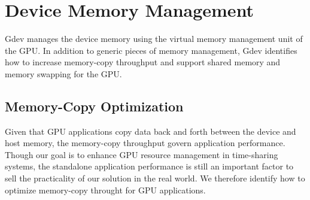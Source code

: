 \section{Device Memory Management}
\label{sec:memory_management}

Gdev manages the device memory using the virtual memory management unit
of the GPU.
In addition to generic pieces of memory management, Gdev
identifies how to increase memory-copy throughput and support shared
memory and memory swapping for the GPU.

\subsection{Memory-Copy Optimization}
\label{sec:memory_copy}

Given that GPU applications copy data back and forth between the device
and host memory, the memory-copy throughput govern application
performance.
Though our goal is to enhance GPU resource management in time-sharing
systems, the standalone application performance is still an 
important factor to sell the practicality of our solution in the
real world.
We therefore identify how to optimize memory-copy throught for GPU
applications.
\begin{comment}
It should be noted that our problem is different from those considered
in previous work~\cite{Jablin_PLDI11, Rossbach_SOSP11} in that we are
looking into a basic single instance of memory-copy transaction, while
the previous work addressed more applied situations where multiple
contexts compete for memory-copy transaction.

First of all, we have found that the memory-copy API functions provided
by proprietary software~\cite{CUDA40} are well-optimized for standalone
operations.
In the following, hence, we disclose how to realize this optimization.
\end{comment}

